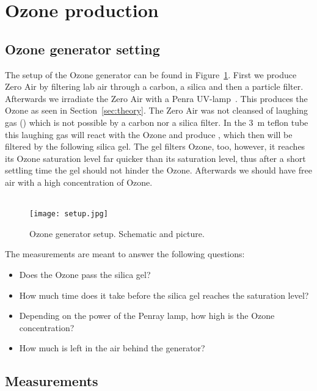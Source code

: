 \section{Ozone production}
\label{sec:ozone}

\subsection{Ozone generator setting}
\label{sec:ozone-setting}

The setup of the Ozone generator can be found in
Figure~\ref{fig:setup}. First we produce Zero Air by filtering lab air
through a carbon, a silica and then a particle filter. Afterwards we
irradiate the Zero Air with a Penra UV-lamp~. This produces the Ozone as seen in
Section~\ref{sec:theory}. The Zero Air was not cleansed of laughing
gas () which is not possible by a carbon nor a silica
filter. In the \SI{3}{\meter} teflon tube this laughing gas will react
with the Ozone and produce , which then will be filtered by
the following silica gel. The gel filters Ozone, too, however, it
reaches its Ozone saturation level far quicker than its 
saturation level, thus after a short settling time the gel should not
hinder the Ozone. Afterwards we should have  free air
with a high concentration of Ozone.

\begin{figure}[htbp]
  \centering
  {
  \def\svgwidth{0.9\linewidth}
  
  }
  \phantom{h}\\
  \bigskip
  \texttt{[image: setup.jpg]}
  \caption{Ozone generator setup. Schematic and picture.}
  \label{fig:setup}
\end{figure}

The measurements are meant to answer the following questions:
\begin{itemize}
\item Does the Ozone pass the silica gel?
\item How much time does it take before the silica gel reaches the
  saturation level?
\item Depending on the power of the Penray lamp, how high is the Ozone
  concentration?
\item How much  is left in the air behind the generator?
\end{itemize}


\subsection{Measurements}
\label{sec:ozone-meas}

